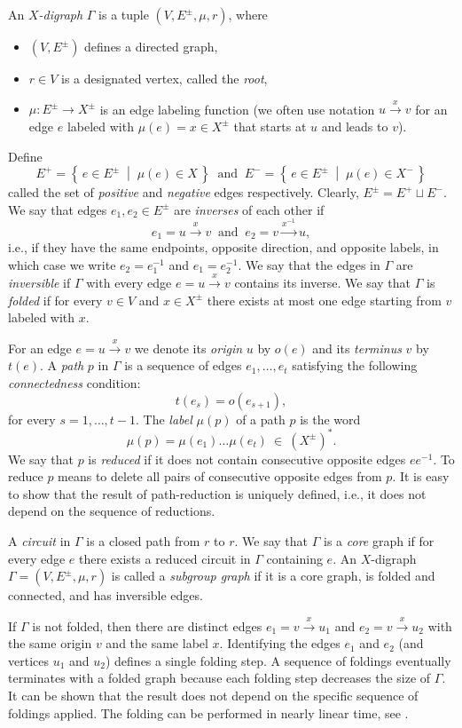 \documentclass[12pt,oneside]{amsart}
\theoremstyle{definition}
\theoremstyle{case}
\newcommand{\Set}[2]{\left\{\, #1 \;\middle|\; #2 \,\right\}}%
\begin{document}
An \emph{$X$-digraph} $\Gamma$ is a tuple $(V,E^\pm,\mu,r)$, where 
\begin{itemize}
\item 
$(V,E^\pm)$ defines a directed graph,
\item 
$r\in V$ is a designated vertex, called the \emph{root},
\item 
$\mu:E^\pm\to X^{\pm}$ is an edge labeling function
(we often use notation $u\stackrel{x}{\to} v$ for an edge $e$
labeled with $\mu(e)=x\in X^\pm$ that starts at $u$ and leads to $v$).
\end{itemize}
Define 
$$E^+=\Set{e\in E^\pm}{\mu(e)\in X}
\ \mbox{ and }\ 
E^-=\Set{e\in E^\pm}{\mu(e)\in X^{-}}$$
called  the set of \emph{positive} and \emph{negative} edges respectively.
Clearly, $E^\pm = E^+ \sqcup E^-$.
We say that edges $e_1,e_2\in E^\pm$ are \emph{inverses} of each other if 
$$
e_1=u\stackrel{x}{\to} v
\ \mbox{ and }\ 
e_2=v\stackrel{x^{-1}}{\to} u,
$$
i.e., if they have the same endpoints, opposite direction,
and opposite labels,
in which case we write $e_2=e_1^{-1}$ and $e_1=e_2^{-1}$.
We say that the edges in $\Gamma$ are \emph{inversible}
if $\Gamma$ with every edge $e=u\stackrel{x}{\to} v$ 
contains its inverse. 
We say that $\Gamma$ is \emph{folded} if for every $v\in V$
and $x\in X^{\pm}$ there exists at most one edge starting from $v$
labeled with $x$.

For an edge $e=u\stackrel{x}{\to} v$ we denote 
its \emph{origin} $u$ by $o(e)$ and its \emph{terminus} $v$ by $t(e)$.
A \emph{path} $p$ in $\Gamma$ is a sequence of edges
$e_{1},\dots,e_{t}$ satisfying the following 
\emph{connectedness} condition:
$$
t(e_{s})=o(e_{s+1}),
$$
for every $s=1,\dots,t-1$.
The \emph{label} $\mu(p)$ of a path $p$ is the word
$$
\mu(p)=\mu(e_{1})\dots\mu(e_{t})\ \in\ (X^{\pm})^\ast.
$$
We say that $p$ is \emph{reduced} if it does not contain consecutive 
opposite edges $ee^{-1}$.
To reduce $p$ means to delete all pairs of consecutive 
opposite edges from $p$.
It is easy to show that the result of path-reduction is uniquely defined,
i.e., it does not depend on the sequence of reductions.

A \emph{circuit} in $\Gamma$ is a closed path from $r$ to $r$.
We say that $\Gamma$ is a \emph{core} graph 
if for every edge $e$ there exists a reduced circuit in $\Gamma$
containing $e$.
An $X$-digraph $\Gamma = (V,E^\pm,\mu,r)$ is called a \emph{subgroup graph} 
if it is a core graph, is folded and connected, and has inversible edges.

If $\Gamma$ is not folded, then there are distinct edges 
$e_1=v\stackrel{x}{\to} u_1$ and $e_2=v\stackrel{x}{\to} u_2$
with the same origin $v$ and the same label $x$.
Identifying the edges $e_1$ and $e_2$ (and vertices $u_1$ and $u_2$) 
defines a single folding step.
A sequence of foldings eventually terminates with a folded graph
because each folding step decreases the size of $\Gamma$.
It can be shown that the result does not depend on the specific 
sequence of foldings applied.
The folding can be performed in nearly linear time, see \cite{Touikan:2006}.
\end{document}
